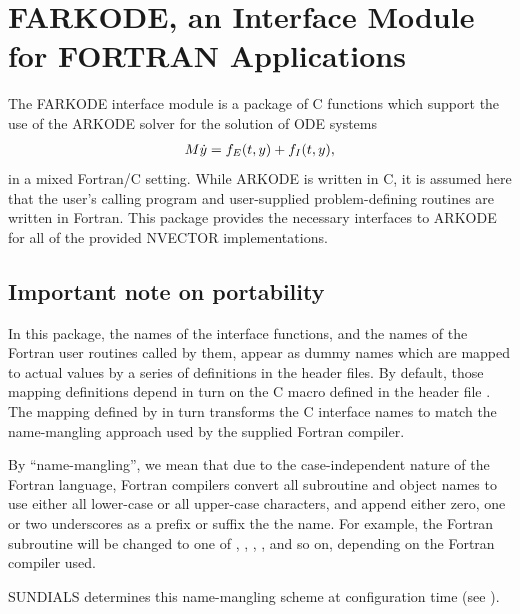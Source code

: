 \documentclass[letterpaper,10pt,english]{sphinxmanual}
\begin{document}
\chapter{FARKODE, an Interface Module for FORTRAN Applications}
\label{f_interface/index:farkode-an-interface-module-for-fortran-applications}\label{f_interface/index:fortraninterface}\label{f_interface/index::doc}
The FARKODE interface module is a package of C functions which
support the use of the ARKODE solver for the solution of ODE
systems
\begin{gather}
\begin{split}M \dot{y} = f_E(t,y) + f_I(t,y),\end{split}\notag
\end{gather}
in a mixed Fortran/C setting.  While ARKODE is written in C, it is
assumed here that the user's calling program and user-supplied
problem-defining routines are written in Fortran. This package
provides the necessary interfaces to ARKODE for all of the provided
NVECTOR implementations.


\section{Important note on portability}
\label{f_interface/index:important-note-on-portability}\label{f_interface/index:finterface-portability}
In this package, the names of the interface functions, and the names
of the Fortran user routines called by them, appear as dummy names
which are mapped to actual values by a series of definitions in the
header files.  By default, those mapping definitions depend in turn
on the C macro  defined in the header file
.  The mapping defined by  in turn
transforms the C interface names to match the name-mangling approach
used by the supplied Fortran compiler.

By ``name-mangling'', we mean that due to the case-independent nature of
the Fortran language, Fortran compilers convert all subroutine and
object names to use either all lower-case or all upper-case
characters, and append either zero, one or two underscores as a prefix
or suffix the the name.  For example, the Fortran subroutine
 will be changed to one of ,
, , , and so on,
depending on the Fortran compiler used.

SUNDIALS determines this name-mangling scheme at configuration time
(see {\hyperref[Install:installation]{\emph{}}}).
\end{document}
